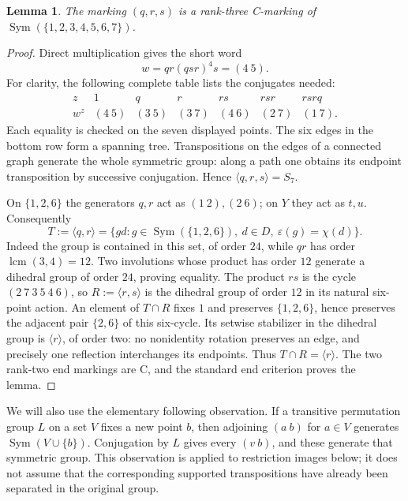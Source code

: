 \documentclass[11pt,a4paper]{article}
\newcommand{\Sym}{\operatorname{Sym}}\newcommand{\Alt}{\operatorname{Alt}}
\newcommand{\gen}[1]{\langle#1\rangle}\newcommand{\eps}{\varepsilon}
\newtheorem{lemma}{Lemma}\newtheorem{theorem}[lemma]{Theorem}
\begin{document}
\begin{lemma}\label{lem:Q}
The marking $(q,r,s)$ is a rank-three C-marking of
$\Sym(\{1,2,3,4,5,6,7\})$.
\end{lemma}
\begin{proof}
Direct multiplication gives the short word
\[
 w=qr(qsr)^4s=(4\ 5).
\]
For clarity, the following complete table lists the conjugates needed:
\[
\begin{array}{c|rrrrrr}
z&1&q&r&rs&rsr&rsrq\\\hline
w^z&(4\ 5)&(3\ 5)&(3\ 7)&(4\ 6)&(2\ 7)&(1\ 7).
\end{array}
\]
Each equality is checked on the seven displayed points. The six edges in
the bottom row form a spanning tree. Transpositions on the edges of a
connected graph generate the whole symmetric group: along a path one
obtains its endpoint transposition by successive conjugation. Hence
$\gen{q,r,s}=S_7$.

On $\{1,2,6\}$ the generators $q,r$ act as $(1\ 2),(2\ 6)$;
on $Y$ they act as $t,u$. Consequently
\begin{equation}\label{eq:T}
 T:=\gen{q,r}
 =\{g d:g\in\Sym(\{1,2,6\}),\ d\in D,\ \eps(g)=\chi(d)\}.
\end{equation}
Indeed the group is contained in this set, of order $24$, while $qr$
has order $\operatorname{lcm}(3,4)=12$. Two involutions whose product
has order $12$ generate a dihedral group of order $24$, proving equality.
The product $rs$ is the cycle $(2\ 7\ 3\ 5\ 4\ 6)$, so
$R:=\gen{r,s}$ is the dihedral group of order $12$ in its natural
six-point action. An element of $T\cap R$ fixes $1$ and preserves
$\{1,2,6\}$, hence preserves the adjacent pair $\{2,6\}$ of this
six-cycle. Its setwise stabilizer in the dihedral group is
$\gen{r}$, of order two: no nonidentity rotation preserves an edge,
and precisely one reflection interchanges its endpoints.
Thus $T\cap R=\gen{r}$. The two rank-two end markings are C, and
the standard end criterion proves the lemma.
\end{proof}

We will also use the elementary following observation. If a transitive
permutation group $L$ on a set $V$ fixes a new point $b$, then adjoining
$(a\ b)$ for $a\in V$ generates $\Sym(V\cup\{b\})$.
Conjugation by $L$ gives every $(v\ b)$, and these generate that
symmetric group. This observation is applied to restriction images below;
it does not assume that the corresponding supported transpositions have
already been separated in the original group.
\end{document}
